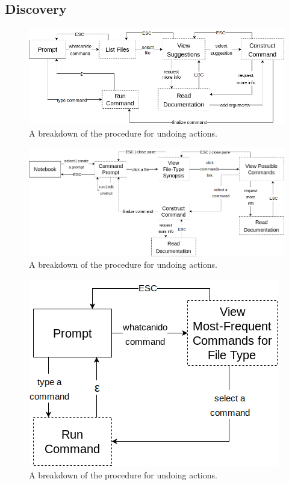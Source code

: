 \subsection{Discovery}

\begin{figure}[H]
  \centering
  \includegraphics[width=0.8\linewidth]{figures/alternatives/file_a.png}
  \caption{A breakdown of the procedure for undoing actions.}
  \label{fig:undoa}
\end{figure}

\begin{figure}[H]
  \centering
  \includegraphics[width=0.8\linewidth]{figures/alternatives/file_b.png}
  \caption{A breakdown of the procedure for undoing actions.}
  \label{fig:undob}
\end{figure}

\begin{figure}[H]
  \centering
  \includegraphics[width=0.8\linewidth]{figures/alternatives/file_c.png}
  \caption{A breakdown of the procedure for undoing actions.}
  \label{fig:undoc}
\end{figure}

